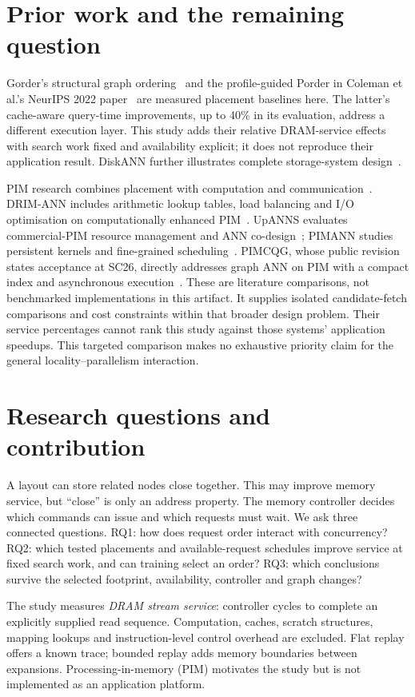 \documentclass[conference]{IEEEtran}
\begin{document}
\section{Prior work and the remaining question}
Gorder's structural graph ordering~\cite{gorder} and the profile-guided Porder in Coleman et al.'s NeurIPS 2022 paper~\cite{coleman} are measured placement baselines here. The latter's cache-aware query-time improvements, up to 40\% in its evaluation, address a different execution layer. This study adds their relative DRAM-service effects with search work fixed and availability explicit; it does not reproduce their application result. DiskANN further illustrates complete storage-system design~\cite{diskann}.

PIM research combines placement with computation and communication~\cite{primer}. DRIM-ANN includes arithmetic lookup tables, load balancing and I/O optimisation on computationally enhanced PIM~\cite{drim}. UpANNS evaluates commercial-PIM resource management and ANN co-design~\cite{upanns}; PIMANN studies persistent kernels and fine-grained scheduling~\cite{pimann}. PIMCQG, whose public revision states acceptance at SC26, directly addresses graph ANN on PIM with a compact index and asynchronous execution~\cite{pimcqg}. These are literature comparisons, not benchmarked implementations in this artifact. It supplies isolated candidate-fetch comparisons and cost constraints within that broader design problem. Their service percentages cannot rank this study against those systems' application speedups. This targeted comparison makes no exhaustive priority claim for the general locality--parallelism interaction.

\section{Research questions and contribution}
A layout can store related nodes close together. This may improve memory service, but ``close'' is only an address property. The memory controller decides which commands can issue and which requests must wait. We ask three connected questions. RQ1: how does request order interact with concurrency? RQ2: which tested placements and available-request schedules improve service at fixed search work, and can training select an order? RQ3: which conclusions survive the selected footprint, availability, controller and graph changes?

The study measures \emph{DRAM stream service}: controller cycles to complete an explicitly supplied read sequence. Computation, caches, scratch structures, mapping lookups and instruction-level control overhead are excluded. Flat replay offers a known trace; bounded replay adds memory boundaries between expansions. Processing-in-memory (PIM) motivates the study but is not implemented as an application platform.
\end{document}
